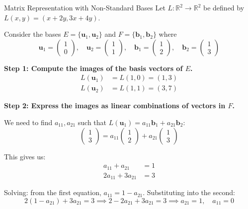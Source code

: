 \documentclass[12pt,a4paper]{article}
\newcommand{\R}{\mathbb{R}}
\newcommand{\vv}[1]{\mathbf{#1}}
\begin{document}
	\begin{example}{Matrix Representation with Non-Standard Bases}
		Let $L: \R^2 \to \R^2$ be defined by $L(x, y) = (x + 2y, 3x + 4y)$.
		
		Consider the bases $E = \{\vv{u}_1, \vv{u}_2\}$ and $F = \{\vv{b}_1, \vv{b}_2\}$ where
		\[
		\vv{u}_1 = \begin{pmatrix} 1 \\ 0 \end{pmatrix}, \quad \vv{u}_2 = \begin{pmatrix} 1 \\ 1 \end{pmatrix}, \quad \vv{b}_1 = \begin{pmatrix} 1 \\ 2 \end{pmatrix}, \quad \vv{b}_2 = \begin{pmatrix} 1 \\ 3 \end{pmatrix}
		\]
		
		\textbf{Step 1: Compute the images of the basis vectors of $E$.}
		\begin{align*}
			L(\vv{u}_1) &= L(1, 0) = (1, 3) \\
			L(\vv{u}_2) &= L(1, 1) = (3, 7)
		\end{align*}
		
		\textbf{Step 2: Express the images as linear combinations of vectors in $F$.}
		
		We need to find $a_{11}, a_{21}$ such that $L(\vv{u}_1) = a_{11}\vv{b}_1 + a_{21}\vv{b}_2$:
		\[
		\begin{pmatrix} 1 \\ 3 \end{pmatrix} = a_{11}\begin{pmatrix} 1 \\ 2 \end{pmatrix} + a_{21}\begin{pmatrix} 1 \\ 3 \end{pmatrix}
		\]
		
		This gives us:
		\begin{align*}
			a_{11} + a_{21} &= 1 \\
			2a_{11} + 3a_{21} &= 3
		\end{align*}
		
		Solving: from the first equation, $a_{11} = 1 - a_{21}$. Substituting into the second:
		\[
		2(1 - a_{21}) + 3a_{21} = 3 \implies 2 - 2a_{21} + 3a_{21} = 3 \implies a_{21} = 1, \quad a_{11} = 0
		\]
		

\end{example}
\end{document}

